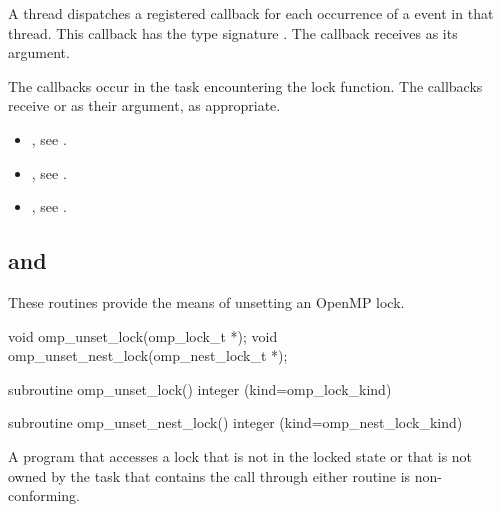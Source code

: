 A thread dispatches a registered 
callback for each occurrence of a  event 
in that thread. This callback has the type signature .
The callback receives  as its  argument.

The callbacks occur in the task encountering
the lock function.  The callbacks receive  or 
  as their  argument, as appropriate.


\crossreferences
\begin{itemize}
\item {}, see 
.
\item {}, see 
.
\item {}, see
.
\end{itemize}




\subsection{ and }
\label{subsec:omp_unset_lock and omp_unset_nest_lock}
\summary
These routines provide the means of unsetting an OpenMP lock.

\format
\begin{ccppspecific}
\begin{boxedcode}
void omp\_unset\_lock(omp\_lock\_t *);
void omp\_unset\_nest\_lock(omp\_nest\_lock\_t *);
\end{boxedcode}
\end{ccppspecific}

\begin{fortranspecific}
\begin{boxedcode}
subroutine omp\_unset\_lock()
integer (kind=omp\_lock\_kind) 

subroutine omp\_unset\_nest\_lock()
integer (kind=omp\_nest\_lock\_kind) 
\end{boxedcode}
\end{fortranspecific}

\constraints
A program that accesses a lock that is not in the locked state or that is 
not owned by the task that contains the call through either routine is 
non-conforming.

